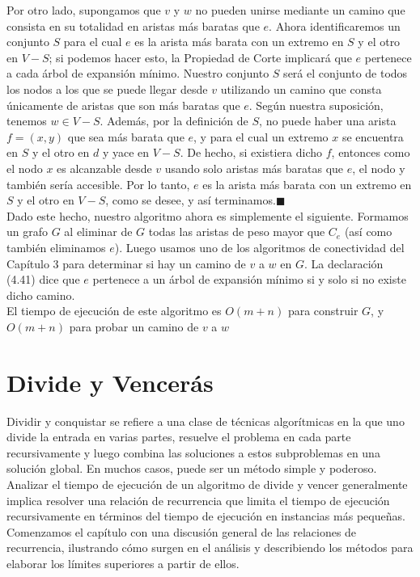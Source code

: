 \documentclass[a4paper, 12pt]{book}
\begin{document}
Por otro lado, supongamos que $v$ y $w$ no pueden unirse mediante un camino que consista en su totalidad en aristas más baratas que $e$. Ahora identificaremos un conjunto $S$ para el cual $e$ es la arista más barata con un extremo en $S$ y el otro en $V-S$; si podemos hacer esto, la Propiedad de Corte implicará que $e$ pertenece a cada árbol de expansión mínimo. Nuestro conjunto $S$ será el conjunto de todos los nodos a los que se puede llegar desde $v$ utilizando un camino que consta únicamente de aristas que son más baratas que $e$. Según nuestra suposición, tenemos $w \in V-S$. Además, por la definición de $S$, no puede haber una arista $f=(x,y)$ que sea más barata que $e$, y para el cual un extremo $x$ se encuentra en $S$ y el otro en $d$ y yace en $V-S$. De hecho, si existiera dicho $f$, entonces como el nodo $x$ es alcanzable desde $v$ usando solo aristas más baratas que $e$, el nodo y también sería accesible. Por lo tanto, $e$ es la arista más barata con un extremo en $S$ y el otro en $V-S$, como se desee, y así terminamos.$\blacksquare$\\

Dado este hecho, nuestro algoritmo ahora es simplemente el siguiente. Formamos un grafo $G$ al eliminar de $G$ todas las aristas de peso mayor que $C_e$ (así como también eliminamos $e$). Luego usamos uno de los algoritmos de conectividad del Capítulo 3 para determinar si hay un camino de $v$ a $w$ en $G$. La declaración (4.41) dice que $e$ pertenece a un árbol de expansión mínimo si y solo si no existe dicho camino.\\

El tiempo de ejecución de este algoritmo es $O(m+n)$ para construir $G$, y $O(m+n)$ para probar un camino de $v$ a $w$\\


\chapter{Divide y Vencerás}

Dividir y conquistar se refiere a una clase de técnicas algorítmicas en la que uno divide la entrada en varias partes, resuelve el problema en cada parte recursivamente y luego combina las soluciones a estos subproblemas en una solución global. En muchos casos, puede ser un método simple y poderoso.\\

Analizar el tiempo de ejecución de un algoritmo de divide y vencer generalmente implica resolver una relación de recurrencia que limita el tiempo de ejecución recursivamente en términos del tiempo de ejecución en instancias más pequeñas. Comenzamos el capítulo con una discusión general de las relaciones de recurrencia, ilustrando cómo surgen en el análisis y describiendo los métodos para elaborar los límites superiores a partir de ellos.\\
\end{document}
